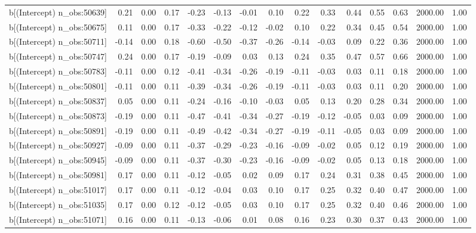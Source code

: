 \begin{table}[ht]
\begin{tabular}{rrrrrrrrrrrrrrr}
  b[(Intercept) n\_obs:50639] & 0.21 & 0.00 & 0.17 & -0.23 & -0.13 & -0.01 & 0.10 & 0.22 & 0.33 & 0.44 & 0.55 & 0.63 & 2000.00 & 1.00 \\ 
  b[(Intercept) n\_obs:50675] & 0.11 & 0.00 & 0.17 & -0.33 & -0.22 & -0.12 & -0.02 & 0.10 & 0.22 & 0.34 & 0.45 & 0.54 & 2000.00 & 1.00 \\ 
  b[(Intercept) n\_obs:50711] & -0.14 & 0.00 & 0.18 & -0.60 & -0.50 & -0.37 & -0.26 & -0.14 & -0.03 & 0.09 & 0.22 & 0.36 & 2000.00 & 1.00 \\ 
  b[(Intercept) n\_obs:50747] & 0.24 & 0.00 & 0.17 & -0.19 & -0.09 & 0.03 & 0.13 & 0.24 & 0.35 & 0.47 & 0.57 & 0.66 & 2000.00 & 1.00 \\ 
  b[(Intercept) n\_obs:50783] & -0.11 & 0.00 & 0.12 & -0.41 & -0.34 & -0.26 & -0.19 & -0.11 & -0.03 & 0.03 & 0.11 & 0.18 & 2000.00 & 1.00 \\ 
  b[(Intercept) n\_obs:50801] & -0.11 & 0.00 & 0.11 & -0.39 & -0.34 & -0.26 & -0.19 & -0.11 & -0.03 & 0.03 & 0.11 & 0.20 & 2000.00 & 1.00 \\ 
  b[(Intercept) n\_obs:50837] & 0.05 & 0.00 & 0.11 & -0.24 & -0.16 & -0.10 & -0.03 & 0.05 & 0.13 & 0.20 & 0.28 & 0.34 & 2000.00 & 1.00 \\ 
  b[(Intercept) n\_obs:50873] & -0.19 & 0.00 & 0.11 & -0.47 & -0.41 & -0.34 & -0.27 & -0.19 & -0.12 & -0.05 & 0.03 & 0.09 & 2000.00 & 1.00 \\ 
  b[(Intercept) n\_obs:50891] & -0.19 & 0.00 & 0.11 & -0.49 & -0.42 & -0.34 & -0.27 & -0.19 & -0.11 & -0.05 & 0.03 & 0.09 & 2000.00 & 1.00 \\ 
  b[(Intercept) n\_obs:50927] & -0.09 & 0.00 & 0.11 & -0.37 & -0.29 & -0.23 & -0.16 & -0.09 & -0.02 & 0.05 & 0.12 & 0.19 & 2000.00 & 1.00 \\ 
  b[(Intercept) n\_obs:50945] & -0.09 & 0.00 & 0.11 & -0.37 & -0.30 & -0.23 & -0.16 & -0.09 & -0.02 & 0.05 & 0.13 & 0.18 & 2000.00 & 1.00 \\ 
  b[(Intercept) n\_obs:50981] & 0.17 & 0.00 & 0.11 & -0.12 & -0.05 & 0.02 & 0.09 & 0.17 & 0.24 & 0.31 & 0.38 & 0.45 & 2000.00 & 1.00 \\ 
  b[(Intercept) n\_obs:51017] & 0.17 & 0.00 & 0.11 & -0.12 & -0.04 & 0.03 & 0.10 & 0.17 & 0.25 & 0.32 & 0.40 & 0.47 & 2000.00 & 1.00 \\ 
  b[(Intercept) n\_obs:51035] & 0.17 & 0.00 & 0.12 & -0.12 & -0.05 & 0.03 & 0.10 & 0.17 & 0.25 & 0.32 & 0.40 & 0.46 & 2000.00 & 1.00 \\ 
  b[(Intercept) n\_obs:51071] & 0.16 & 0.00 & 0.11 & -0.13 & -0.06 & 0.01 & 0.08 & 0.16 & 0.23 & 0.30 & 0.37 & 0.43 & 2000.00 & 1.00 \\ 

\end{tabular}
\end{table}
